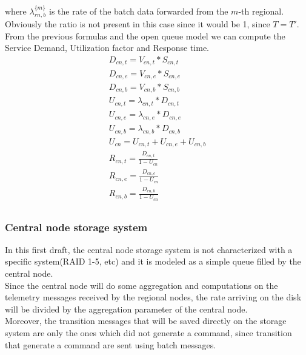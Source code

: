 \documentclass[11pt]{article}
\begin{document}
where $\lambda^{\{ m \}}_{rn, b}$ is the rate of the batch data forwarded from the $m$-th regional.
Obviously the ratio is not present in this case since it would be 1, since $T = T'$.\\
From the previous formulas and the open queue model we can compute the Service Demand, Utilization factor and Response time.
\begin{equation}
	\begin{array}{l}
		D_{cn, t} = V_{cn, t} * S_{cn, t} \\
		D_{cn, e} = V_{cn, e} * S_{cn, e} \\
		D_{cn, b} = V_{cn, b} * S_{cn, b} \\
		U_{cn, t} = \lambda_{cn, t} * D_{cn, t} \\
		U_{cn, e} = \lambda_{cn, e} * D_{cn, e} \\
		U_{cn, b} = \lambda_{cn, b} * D_{cn, b} \\
		U_{cn} = U_{cn, t} + U_{cn, e} + U_{cn, b} \\
		R_{cn, t} = \frac{D_{cn, t}}{1 - U_{cn}} \\
		R_{cn, e} = \frac{D_{cn, e}}{1 - U_{cn}} \\
		R_{cn, b} = \frac{D_{cn, b}}{1 - U_{cn}} \\
	\end{array}
\end{equation}

\subsubsection{Central node storage system}
In this first draft, the central node storage system is not characterized with a specific system(RAID 1-5, etc) and it is modeled as a simple queue filled by the central node.\\
Since the central node will do some aggregation and computations on the telemetry messages received by the regional nodes, the rate arriving on the disk will be divided by the aggregation parameter of the central node.\\
Moreover, the transition messages that will be saved directly on the storage system are only the ones which did not generate a command, since transition that generate a command are sent using batch messages.
\end{document}
